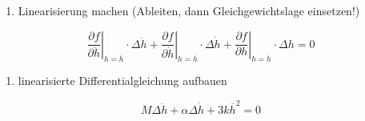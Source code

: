 \documentclass[
  10pt,
  a4paper,
  twocolumn]{article}
\providecommand{\tightlist}{%
  \setlength{\itemsep}{0pt}\setlength{\parskip}{0pt}}\usepackage{longtable,booktabs,array}
\numberwithin{equation}{section}
\begin{document}
\begin{tcolorbox}
\small

\begin{enumerate}
\def\labelenumi{\arabic{enumi}.}
\setcounter{enumi}{3}
\tightlist
\item
  Linearisierung machen (Ableiten, dann Gleichgewichtslage einsetzen!)
\end{enumerate}

\normalsize

\[
\left.\frac{\partial f}{\partial \ddot{h}}\right\rvert_{h=\overline{h}} \cdot \Delta\ddot{h} + \left.\frac{\partial f}{\partial \dot{h}}\right\rvert_{h=\overline{h}} \cdot \Delta\dot{h} + \left.\frac{\partial f}{\partial h}\right\rvert_{h=\overline{h}} \cdot \Delta{h} = 0
\]

\small

\begin{enumerate}
\def\labelenumi{\arabic{enumi}.}
\setcounter{enumi}{4}
\tightlist
\item
  linearisierte Differentialgleichung aufbauen
\end{enumerate}

\normalsize

\[
M\Delta \ddot{h} + \alpha \Delta \dot{h} + 3 k\overline{h}^2=0
\]

\end{tcolorbox}
\end{document}
